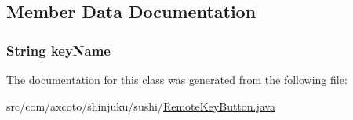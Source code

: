 \subsection{\-Member \-Data \-Documentation}
\hypertarget{classcom_1_1axcoto_1_1shinjuku_1_1sushi_1_1_remote_key_button_a89c32c1f801aee1e2f7bc48b676f3428}{
\subsubsection[{key\-Name}]{\setlength{\rightskip}{0pt plus 5cm}\-String {\bf key\-Name}}}\label{classcom_1_1axcoto_1_1shinjuku_1_1sushi_1_1_remote_key_button_a89c32c1f801aee1e2f7bc48b676f3428}


\-The documentation for this class was generated from the following file\-:\begin{DoxyCompactItemize}
\item 
src/com/axcoto/shinjuku/sushi/\hyperlink{_remote_key_button_8java}{\-Remote\-Key\-Button.\-java}\end{DoxyCompactItemize}
